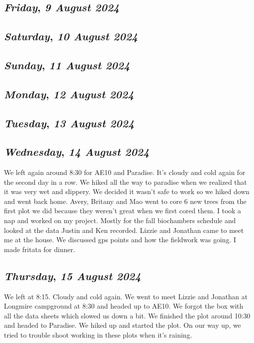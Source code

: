 \def\day{\textit{9 August 2024}}
\def\weekday{\textit{Friday}}
\subsection*{\weekday, \day}

\def\day{\textit{10 August 2024}}
\def\weekday{\textit{Saturday}}
\subsection*{\weekday, \day}

\def\day{\textit{11 August 2024}}
\def\weekday{\textit{Sunday}}
\subsection*{\weekday, \day}

\def\day{\textit{12 August 2024}}
\def\weekday{\textit{Monday}}
\subsection*{\weekday, \day}

\def\day{\textit{13 August 2024}}
\def\weekday{\textit{Tuesday}}
\subsection*{\weekday, \day}

\def\day{\textit{14 August 2024}}
\def\weekday{\textit{Wednesday}}
\subsection*{\weekday, \day}
We left again around 8:30 for AE10 and Paradise. It's cloudy and cold again for the second day in a row. We hiked all the way to paradise when we realized that it was very wet and slippery. We decided it wasn't safe to work so we hiked down and went back home. Avery, Britany and Mao went to core 6 new trees from the first plot we did because they weren't great when we first cored them. I took a nap and worked on my project. Mostly for the fall biochambers schedule and looked at the data Justin and Ken recorded.
Lizzie and Jonathan came to meet me at the house. We discussed gps points and how the fieldwork was going. I made fritata for dinner.

\def\day{\textit{15 August 2024}}
\def\weekday{\textit{Thursday}}
\subsection*{\weekday, \day}
We left at 8:15. Cloudy and cold again. We went to meet Lizzie and Jonathan at Longmire campground at 8:30 and headed up to AE10. We forgot the box with all the data sheets which slowed us down a bit. We finished the plot around 10:30 and headed to Paradise. We hiked up and started the plot. On our way up, we tried to trouble shoot working in these plots when it's raining.
\def\day{\textit{16 August 2024}}
\def\weekday{\textit{Friday}}
